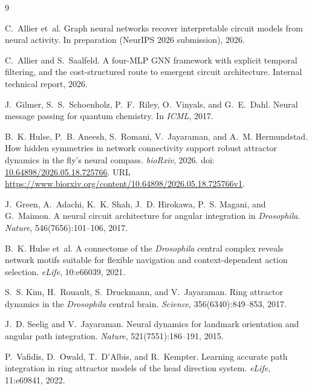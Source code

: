 \documentclass[11pt]{article}
\begin{document}
\begin{thebibliography}{9}

C.~Allier et~al.
\newblock Graph neural networks recover interpretable circuit models
  from neural activity.
\newblock In preparation (NeurIPS 2026 submission), 2026.

C.~Allier and S.~Saalfeld.
\newblock A four-MLP GNN framework with explicit temporal filtering, and
  the cost-structured route to emergent circuit architecture.
\newblock Internal technical report, 2026.

J.~Gilmer, S.~S.~Schoenholz, P.~F.~Riley, O.~Vinyals, and G.~E.~Dahl.
\newblock Neural message passing for quantum chemistry.
\newblock In \emph{ICML}, 2017.

B.~K. Hulse, P.~B. Aneesh, S.~Romani, V.~Jayaraman, and A.~M. Hermundstad.
\newblock How hidden symmetries in network connectivity support robust
  attractor dynamics in the fly's neural compass.
\newblock \emph{bioRxiv}, 2026.
  doi:\,\href{https://doi.org/10.64898/2026.05.18.725766}{10.64898/2026.05.18.725766}.
\newblock URL \url{https://www.biorxiv.org/content/10.64898/2026.05.18.725766v1}.

J.~Green, A.~Adachi, K.~K. Shah, J.~D. Hirokawa, P.~S. Magani, and
  G.~Maimon.
\newblock A neural circuit architecture for angular integration in
  \emph{Drosophila}.
\newblock \emph{Nature}, 546(7656):101--106, 2017.

B.~K. Hulse et~al.
\newblock A connectome of the \emph{Drosophila} central complex reveals
  network motifs suitable for flexible navigation and context-dependent
  action selection.
\newblock \emph{eLife}, 10:e66039, 2021.

S.~S. Kim, H.~Rouault, S.~Druckmann, and V.~Jayaraman.
\newblock Ring attractor dynamics in the \emph{Drosophila} central brain.
\newblock \emph{Science}, 356(6340):849--853, 2017.

J.~D. Seelig and V.~Jayaraman.
\newblock Neural dynamics for landmark orientation and angular path
  integration.
\newblock \emph{Nature}, 521(7551):186--191, 2015.

P.~Vafidis, D.~Owald, T.~D'Albis, and R.~Kempter.
\newblock Learning accurate path integration in ring attractor models
  of the head direction system.
\newblock \emph{eLife}, 11:e69841, 2022.


\end{thebibliography}
\end{document}
